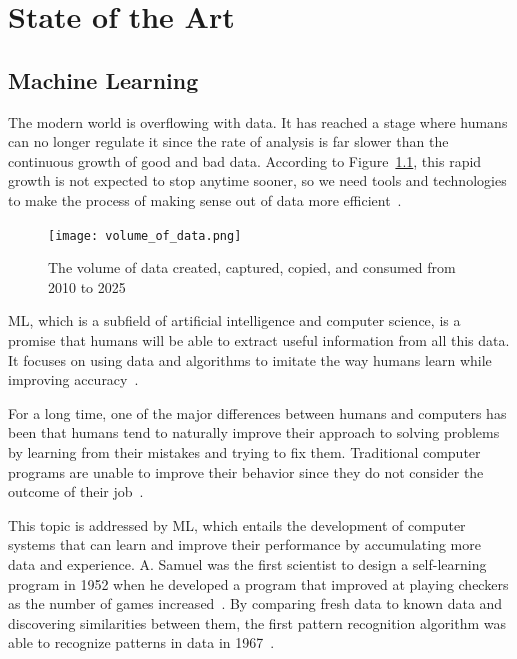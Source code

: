 \chapter{State of the Art} \label{cha:users_manual}

\section{Machine Learning} \label{sec:ml}

The modern world is overflowing with data. It has reached a stage where humans can no longer regulate it since the rate of analysis is far slower than the continuous growth of good and bad data. According to Figure~\ref{fig:volume_of_data}, this rapid growth is not expected to stop anytime sooner, so we need tools and technologies to make the process of making sense out of data more efficient~\cite{G2017WhatLearning}.

\begin{figure}[htbp]
    \centering
    \texttt{[image: volume\_of\_data.png]}
    \caption{The volume of data created, captured, copied, and consumed from 2010 to 2025~\cite{TotalStatista}}
    \label{fig:volume_of_data}
\end{figure}

\gls{ML}, which is a subfield of artificial intelligence and computer science, is a promise that humans will be able to extract useful information from all this data. It focuses on using data and algorithms to imitate the way humans learn while improving accuracy~\cite{IBMCloudEducationWhatLearning}.

For a long time, one of the major differences between humans and computers has been that humans tend to naturally improve their approach to solving problems by learning from their mistakes and trying to fix them. Traditional computer programs are unable to improve their behavior since they do not consider the outcome of their job~\cite{Luckert2016UsingDocuments}. 

This topic is addressed by \gls{ML}, which entails the development of computer systems that can learn and improve their performance by accumulating more data and experience. A. Samuel was the first scientist to design a self-learning program in 1952 when he developed a program that improved at playing checkers as the number of games increased~\cite{Samuel1959SomeCheckers}. By comparing fresh data to known data and discovering similarities between them, the first pattern recognition algorithm was able to recognize patterns in data in 1967~\cite{Luckert2016UsingDocuments}. 

